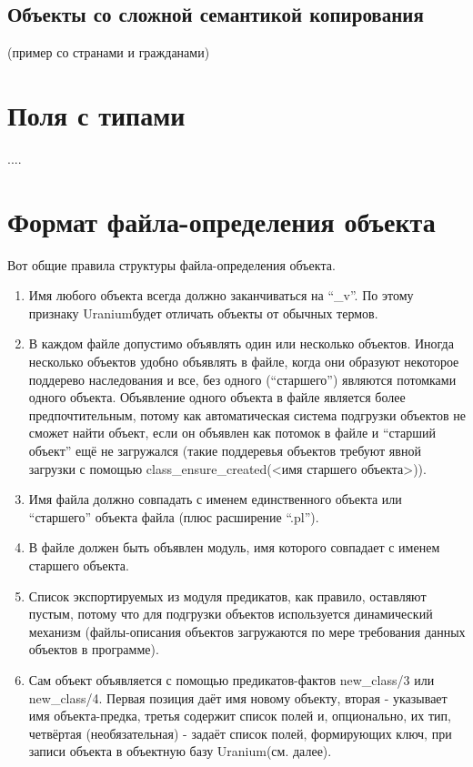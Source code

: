 \documentclass[a4paper]{book}
\def\ur{Uranium}
\begin{document}
\subsection{Объекты со сложной семантикой копирования}
\label{limited_types}

(пример со странами и гражданами)

\section{Поля с типами}

....

\section{Формат файла-определения объекта}
\label{object_file_format}

Вот общие правила структуры файла-определения объекта.

\begin{enumerate}
\item Имя любого объекта всегда должно
  заканчиваться на ``_v''. По этому признаку \ur будет
  отличать объекты от обычных термов.
\item В каждом файле допустимо объявлять один или несколько
  объектов. Иногда несколько объектов удобно объявлять в файле,
  когда они образуют некоторое поддерево наследования и все, без
  одного (``старшего'') являются потомками одного
  объекта. Объявление одного объекта в файле является более
  предпочтительным, потому как автоматическая система подгрузки
  объектов не сможет найти объект, если он объявлен как потомок в
  файле и ``старший объект'' ещё не загружался (такие поддеревья
  объектов требуют явной загрузки с помощью
  class_ensure_created(<имя старшего объекта>)).
\item Имя файла должно совпадать с именем единственного объекта
  или ``старшего'' объекта файла (плюс расширение ``.pl'').
\item В файле должен быть объявлен модуль, имя которого совпадает
  с именем старшего объекта.
\item Список экспортируемых из модуля предикатов, как правило,
  оставляют пустым, потому что для подгрузки объектов
  используется динамический механизм (файлы-описания объектов
  загружаются по мере требования данных объектов в программе).
\item Сам объект объявляется с помощью предикатов-фактов
  new_class/3 или new_class/4. Первая позиция даёт имя новому
  объекту, вторая - указывает имя объекта-предка, третья содержит
  список полей и, опционально, их тип, четвёртая (необязательная)
  - задаёт список полей, формирующих ключ, при записи объекта в
  объектную базу \ur (см. далее).
\end{enumerate}
\end{document}
